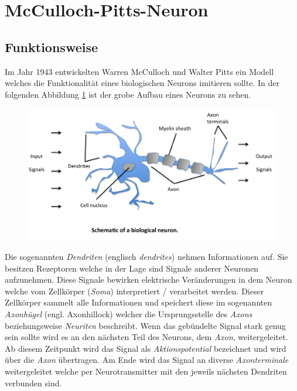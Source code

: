 \section{McCulloch-Pitts-Neuron}

\subsection{Funktionsweise}

Im Jahr 1943 entwickelten Warren McCulloch und Walter Pitts ein Modell welches die Funktionalität eines biologischen Neurons imitieren sollte. In der folgenden Abbildung \ref{fig:bioNeuron} ist der grobe Aufbau eines Neurons zu sehen. 

\begin{figure}[!htb]
	\centering
	\includegraphics[width=\linewidth]{img/bioNeuron}
	\label{fig:bioNeuron}
\end{figure}

Die sogenannten \emph{Dendriten} (englisch \emph{dendrites}) nehmen Informationen auf. Sie besitzen Rezeptoren welche in der Lage sind Signale anderer Neuronen aufzunehmen. Diese Signale bewirken elektrische Veränderungen in dem Neuron welche vom Zellkörper (\emph{Soma}) interpretiert / verarbeitet werden. Dieser Zellkörper sammelt alle Informationen und speichert diese im sogenannten \emph{Axonhügel} (engl. Axonhillock) welcher die Ursprungsstelle des \emph{Axons} beziehungsweise \emph{Neuriten} beschreibt. Wenn das gebündelte Signal stark genug sein sollte wird es an den nächsten Teil des Neurons, dem \emph{Axon}, weitergeleitet. Ab diesem Zeitpunkt wird das Signal als \emph{Aktionspotential} bezeichnet und wird über die \emph{Axon} übertragen. Am Ende wird das Signal an diverse \emph{Axonterminale} weitergeleitet welche per Neurotransmitter mit den jeweils nächsten Dendriten verbunden sind. 

